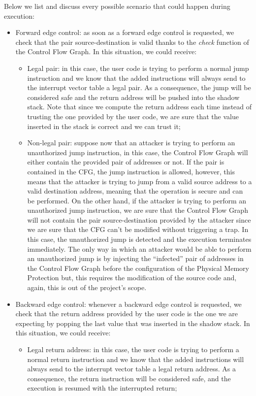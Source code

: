Below we list and discuss every possible scenario that could happen during execution:
\begin{itemize}
  \item Forward edge control: as soon as a forward edge control is requested, we
    check that the pair source-destination is valid thanks to the \textit{check}
    function of the Control Flow Graph. In this situation, we could receive:
    \begin{itemize}
      \item Legal pair: in this case, the user code is trying to perform a normal
        jump instruction and we know that the added instructions will always send
        to the interrupt vector table a legal pair. As a consequence, the jump will
        be considered safe and the return address will be pushed into the shadow
        stack. Note that since we compute the return address each time instead
        of trusting the one provided by the user code, we are sure that the value
        inserted in the stack is correct and we can trust it;

      \item Non-legal pair: suppose now that an attacker is trying to perform an
        unauthorized jump instruction, in this case, the Control Flow Graph will
        either contain the provided pair of addresses or not. If the pair is contained
        in the CFG, the jump instruction is allowed, however, this means that
        the attacker is trying to jump from a valid source address to a valid
        destination address, meaning that the operation is secure and can be performed.
        On the other hand, if the attacker is trying to perform an unauthorized jump
        instruction, we are sure that the Control Flow Graph will not contain
        the pair source-destination provided by the attacker since we are sure
        that the CFG can't be modified without triggering a trap. In this case,
        the unauthorized jump is detected and the execution terminates
        immediately. The only way in which an attacker would be able to perform an
        unauthorized jump is by injecting the ``infected'' pair of addresses in the
        Control Flow Graph before the configuration of the Physical Memory Protection
        but, this requires the modification of the source code and, again, this
        is out of the project's scope.
    \end{itemize}

  \item Backward edge control: whenever a backward edge control is requested, we
    check that the return address provided by the user code is the one we are expecting
    by popping the last value that was inserted in the shadow stack. In this
    situation, we could receive:
    \begin{itemize}
      \item Legal return address: in this case, the user code is trying to perform
        a normal return instruction and we know that the added instructions will
        always send to the interrupt vector table a legal return address. As a
        consequence, the return instruction will be considered safe, and the
        execution is resumed with the interrupted return;


\end{itemize}
\end{itemize}
